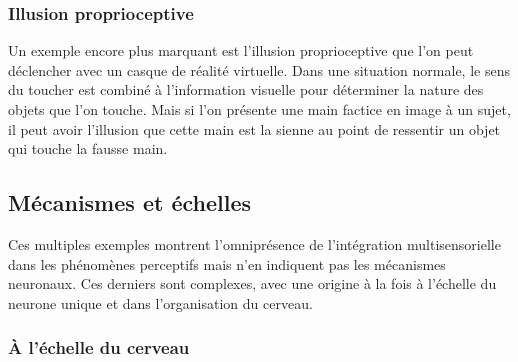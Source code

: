 \subsubsection{Illusion proprioceptive}

Un exemple encore plus marquant est l'illusion proprioceptive que l'on peut déclencher avec un casque de réalité virtuelle. Dans une situation normale, le sens du toucher est combiné à l'information visuelle pour déterminer la nature des objets que l'on touche. Mais si l'on présente une main factice en image à un sujet, il peut avoir l'illusion que cette main est la sienne au point de ressentir un objet qui touche la fausse main.

\subsection{Mécanismes et échelles}

Ces multiples exemples montrent l'omniprésence de l'intégration multisensorielle dans les phénomènes perceptifs mais n'en indiquent pas les mécanismes neuronaux. Ces derniers sont complexes, avec une origine à la fois à l'échelle du neurone unique et dans l'organisation du cerveau.

\subsubsection{À l'échelle du cerveau}


